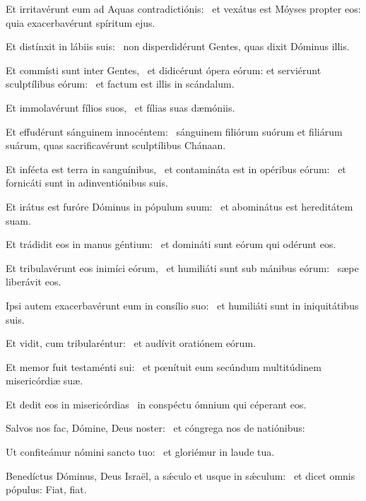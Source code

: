 
\item Et irritavérunt eum ad Aquas contradictiónis:~\psstar{} et vexátus est Móyses propter eos: quia exacerbavérunt spíritum ejus.

\item Et distínxit in lábiis suis:~\psstar{} non disperdidérunt Gentes, quas dixit Dóminus illis.

\item Et commísti sunt inter Gentes,~\pscross{} et didicérunt ópera eórum: et serviérunt sculptílibus eórum:~\psstar{} et factum est illis in scándalum.

\item Et immolavérunt fílios suos,~\psstar{} et fílias suas dæmóniis.

\item Et effudérunt sánguinem innocéntem:~\psstar{} sánguinem filiórum suórum et filiárum suárum, quas sacrificavérunt sculptílibus Chánaan.

\item Et infécta est terra in sanguínibus,~\pscross{} et contamináta est in opéribus eórum:~\psstar{} et fornicáti sunt in adinventiónibus suis.

\item Et irátus est furóre Dóminus in pópulum suum:~\psstar{} et abominátus est hereditátem suam.

\item Et trádidit eos in manus géntium:~\psstar{} et domináti sunt eórum qui odérunt eos.

\item Et tribulavérunt eos inimíci eórum,~\pscross{} et humiliáti sunt sub mánibus eórum:~\psstar{} sæpe liberávit eos.

\item Ipsi autem exacerbavérunt eum in consílio suo:~\psstar{} et humiliáti sunt in iniquitátibus suis.

\item Et vidit, cum tribularéntur:~\psstar{} et audívit oratiónem eórum.

\item Et memor fuit testaménti sui:~\psstar{} et pœnítuit eum secúndum multitúdinem misericórdiæ suæ.

\item Et dedit eos in misericórdias~\psstar{} in conspéctu ómnium qui céperant eos.

\item Salvos nos fac, Dómine, Deus noster:~\psstar{} et cóngrega nos de natiónibus:

\item Ut confiteámur nómini sancto tuo:~\psstar{} et gloriémur in laude tua.

\item Benedíctus Dóminus, Deus Israël, a sǽculo et usque in sǽculum:~\psstar{} et dicet omnis pópulus: Fiat, fiat.